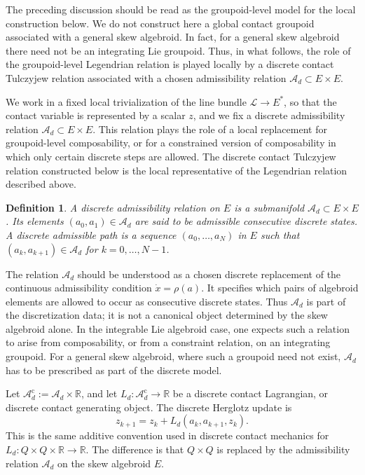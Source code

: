 \documentclass[11pt]{article}
\newtheorem{definition}[theorem]{Definition}
\newcommand{\R}{\mathbb{R}}
\newcommand{\mc}[1]{\mathcal{#1}}
\newcommand{\Lbundle}{\mathcal{L}}
\begin{document}
The preceding discussion should be read as the groupoid-level model for the
local construction below. We do not construct here a global contact groupoid
associated with a general skew algebroid. In fact, for a general skew
algebroid there need not be an integrating Lie groupoid. Thus, in what follows,
the role of the groupoid-level Legendrian relation is played locally by a
discrete contact Tulczyjew relation associated with a chosen admissibility
relation \(\mc A_d\subset E\times E\).

We work in a fixed local trivialization of the line bundle \(\Lbundle\to E^*\),
so that the contact variable is represented by a scalar \(z\), and we fix a
discrete admissibility relation \(\mc A_d\subset E\times E\). This relation plays the role of a local replacement for groupoid-level
composability, or for a constrained version of composability in which only
certain discrete steps are allowed. The discrete contact Tulczyjew relation constructed below
is the local representative of the Legendrian relation described above.


\begin{definition}
A discrete admissibility relation on \(E\) is a submanifold
$\mc A_d\subset E\times E$. Its elements \((a_0,a_1)\in\mc A_d\) are said to be admissible consecutive
discrete states. A discrete admissible path is a sequence
\((a_0,\dots,a_N)\) in \(E\) such that $(a_k,a_{k+1})\in\mc A_d$ for $k=0,\dots,N-1$.
\end{definition}

The relation \(\mc A_d\) should be understood as a chosen discrete replacement
of the continuous admissibility condition \(\dot x=\rho(a)\). It specifies
which pairs of algebroid elements are allowed to occur as consecutive discrete
states. Thus \(\mc A_d\) is part of the discretization data; it is not a
canonical object determined by the skew algebroid alone. In the integrable
Lie algebroid case, one expects such a relation to arise from composability,
or from a constraint relation, on an integrating groupoid. For a general skew
algebroid, where such a groupoid need not exist, \(\mc A_d\) has to be prescribed
as part of the discrete model.

Let \(\mc A_d^{\mathrm c}:=\mc A_d\times\R\), and let
\(L_d:\mc A_d^{\mathrm c}\to\R\) be a discrete contact Lagrangian, or discrete
contact generating object. The discrete Herglotz update is
\begin{equation}
z_{k+1}=z_k+L_d(a_k,a_{k+1},z_k).
\label{eq:discrete-herglotz-update}
\end{equation}
This is the same additive convention used in discrete contact mechanics \cite{SimoesMartinDeDiegoLainzDeLeon2021} for
\(L_d:Q\times Q\times\R\to\R\). The difference is that \(Q\times Q\) is
replaced by the admissibility relation \(\mc A_d\) on the skew algebroid $E$.
\end{document}
